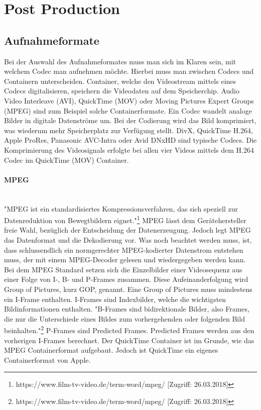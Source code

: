 \section{Post Production}
\subsection{Aufnahmeformate}
Bei der Auswahl des Aufnahmeformates muss man sich im Klaren sein, mit welchem Codec man aufnehmen möchte. Hierbei muss man zwischen Codecs und Containern unterscheiden. Container, welche den Videostream mittels eines Codecs digitalisieren, speichern die Videodaten auf dem Speicherchip. Audio Video Interleave (AVI), QuickTime (MOV) oder Moving Pictures Expert Groups (MPEG) sind zum Beispiel solche Containerformate. Ein Codec wandelt analoge Bilder in digitale Datenströme um. Bei der Codierung wird das Bild komprimiert, was wiederum mehr Speicherplatz zur Verfügung stellt. DivX, QuickTime H.264, Apple ProRes, Panasonic AVC-Intra oder Avid DNxHD sind typische Codecs.\newline
Die Komprimierung des Videosignals erfolgte bei allen vier Videos mittels dem H.264 Codec im QuickTime (MOV) Container. 
\paragraph{MPEG}
\leavevmode \\
"MPEG ist ein standardisiertes Kompressionsverfahren, das sich speziell zur Datenreduktion von Bewegtbildern eignet."\footnote{\label{}https://www.film-tv-video.de/term-word/mpeg/ [Zugriff: 26.03.2018]} MPEG lässt dem Gerätehersteller freie Wahl, bezüglich der Entscheidung der Datenerzeugung. Jedoch legt MPEG das Datenformat und die Dekodierung vor. Was noch beachtet werden muss, ist, dass schlussendlich ein normgerechter MPEG-kodierter Datenstrom entstehen muss, der mit einem MPEG-Decoder gelesen und wiedergegeben werden kann. Bei dem MPEG Standard setzen sich die Einzelbilder einer Videosequenz aus einer Folge von I-, B- und P-Frames zusammen. Diese Aufeinanderfolgung wird Group of Pictures, kurz GOP, genannt. Eine Group of Pictures muss mindestens ein I-Frame enthalten. I-Frames sind Indexbilder, welche die wichtigsten Bildinformationen enthalten. "B-Frames sind  bidirektionale Bilder, also Frames, die nur die Unterschiede eines Bildes zum vorhergehenden oder folgenden Bild beinhalten."\footnote{\label{}https://www.film-tv-video.de/term-word/mpeg/ [Zugriff: 26.03.2018]} P-Frames sind Predicted Frames. Predicted Frames werden aus den vorherigen I-Frames berechnet.\newline
Der QuickTime Container ist im Grunde, wie das MPEG Containerformat aufgebaut. Jedoch ist QuickTime ein eigenes Containerformat von Apple.
